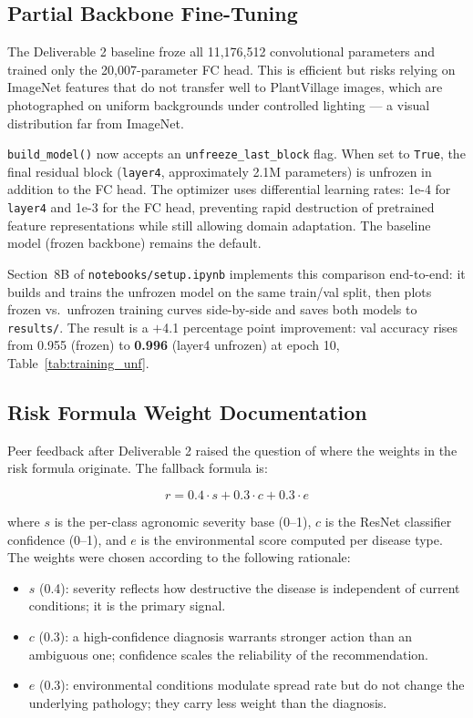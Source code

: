 \documentclass[conference]{IEEEtran}
\let\oldtexttt\texttt
\renewcommand{\texttt}[1]{{\small\oldtexttt{#1}}}
\begin{document}
\subsection{Partial Backbone Fine-Tuning}

The Deliverable 2 baseline froze all 11,176,512 convolutional parameters and trained only the 20,007-parameter FC head. This is efficient but risks relying on ImageNet features that do not transfer well to PlantVillage images, which are photographed on uniform backgrounds under controlled lighting --- a visual distribution far from ImageNet.

\texttt{build\_model()} now accepts an \texttt{unfreeze\_last\_block} flag. When set to \texttt{True}, the final residual block (\texttt{layer4}, approximately 2.1M parameters) is unfrozen in addition to the FC head. The optimizer uses differential learning rates: 1e-4 for \texttt{layer4} and 1e-3 for the FC head, preventing rapid destruction of pretrained feature representations while still allowing domain adaptation. The baseline model (frozen backbone) remains the default.

Section~8B of \texttt{notebooks/setup.ipynb} implements this comparison end-to-end: it builds and trains the unfrozen model on the same train/val split, then plots frozen vs.\ unfrozen training curves side-by-side and saves both models to \texttt{results/}. The result is a $+$4.1 percentage point improvement: val accuracy rises from 0.955 (frozen) to \textbf{0.996} (layer4 unfrozen) at epoch 10, Table~\ref{tab:training_unf}.

\subsection{Risk Formula Weight Documentation}

Peer feedback after Deliverable 2 raised the question of where the weights in the risk formula originate. The fallback formula is:

\begin{equation}
r = 0.4 \cdot s + 0.3 \cdot c + 0.3 \cdot e
\label{eq:risk}
\end{equation}

\noindent where $s$ is the per-class agronomic severity base (0--1), $c$ is the ResNet classifier confidence (0--1), and $e$ is the environmental score computed per disease type. The weights were chosen according to the following rationale:
\begin{itemize}
  \item $s$ (0.4): severity reflects how destructive the disease is independent of current conditions; it is the primary signal.
  \item $c$ (0.3): a high-confidence diagnosis warrants stronger action than an ambiguous one; confidence scales the reliability of the recommendation.
  \item $e$ (0.3): environmental conditions modulate spread rate but do not change the underlying pathology; they carry less weight than the diagnosis.
\end{itemize}
\end{document}

